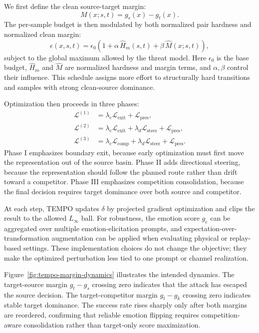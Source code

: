 We first define the clean source-target margin:
\begin{equation}
M(x;s,t)=g_s(x)-g_t(x).
\label{eq:tempo-source-margin}
\end{equation}
The per-sample budget is then modulated by both normalized pair hardness and normalized clean margin:
\begin{equation}
\epsilon(x,s,t)
=
\epsilon_0
\left(
1+\alpha\,\widehat{H}_m(s,t)+\beta\,\widehat{M}(x;s,t)
\right),
\label{eq:tempo-budget}
\end{equation}
subject to the global maximum allowed by the threat model. Here $\epsilon_0$ is the base budget, $\widehat{H}_m$ and $\widehat{M}$ are normalized hardness and margin terms, and $\alpha,\beta$ control their influence. This schedule assigns more effort to structurally hard transitions and samples with strong clean-source dominance.

Optimization then proceeds in three phases:
\begin{align}
\mathcal{L}^{(1)} &= \lambda_e \mathcal{L}_{\mathrm{exit}} + \mathcal{L}_{\mathrm{pres}},
\label{eq:tempo-phase1}\\
\mathcal{L}^{(2)} &= \lambda_e \mathcal{L}_{\mathrm{exit}} + \lambda_d \mathcal{L}_{\mathrm{steer}} + \mathcal{L}_{\mathrm{pres}},
\label{eq:tempo-phase2}\\
\mathcal{L}^{(3)} &= \lambda_c \mathcal{L}_{\mathrm{comp}} + \lambda_d \mathcal{L}_{\mathrm{steer}} + \mathcal{L}_{\mathrm{pres}}.
\label{eq:tempo-phase3}
\end{align}
Phase I emphasizes boundary exit, because early optimization must first move the representation out of the source basin. Phase II adds directional steering, because the representation should follow the planned route rather than drift toward a competitor. Phase III emphasizes competition consolidation, because the final decision requires target dominance over both source and competitor.

At each step, TEMPO updates $\delta$ by projected gradient optimization and clips the result to the allowed $L_\infty$ ball. For robustness, the emotion score $g_e$ can be aggregated over multiple emotion-elicitation prompts, and expectation-over-transformation augmentation can be applied when evaluating physical or replay-based settings. These implementation choices do not change the objective; they make the optimized perturbation less tied to one prompt or channel realization.

Figure~\ref{fig:tempo-margin-dynamics} illustrates the intended dynamics. The target-source margin $g_t-g_s$ crossing zero indicates that the attack has escaped the source decision. The target-competitor margin $g_t-g_k$ crossing zero indicates stable target dominance. The success rate rises sharply only after both margins are reordered, confirming that reliable emotion flipping requires competition-aware consolidation rather than target-only score maximization.

